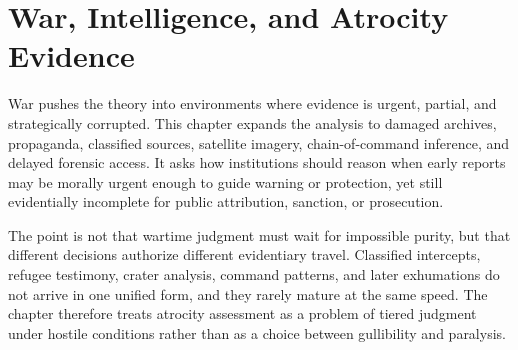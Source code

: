 
\chapter{War, Intelligence, and Atrocity Evidence}
\label{ch:ch085}

War pushes the theory into environments where evidence is urgent, partial, and strategically corrupted. This chapter expands the analysis to damaged archives, propaganda, classified sources, satellite imagery, chain-of-command inference, and delayed forensic access. It asks how institutions should reason when early reports may be morally urgent enough to guide warning or protection, yet still evidentially incomplete for public attribution, sanction, or prosecution.

The point is not that wartime judgment must wait for impossible purity, but that different decisions authorize different evidentiary travel. Classified intercepts, refugee testimony, crater analysis, command patterns, and later exhumations do not arrive in one unified form, and they rarely mature at the same speed. The chapter therefore treats atrocity assessment as a problem of tiered judgment under hostile conditions rather than as a choice between gullibility and paralysis.
